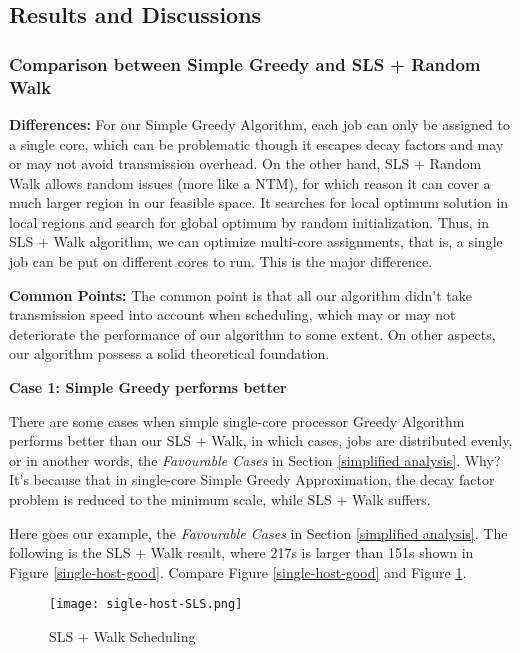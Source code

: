 \documentclass{article}
\begin{document}
\subsection{Results and Discussions}
    \label{comprehensive analysis}
\subsubsection{Comparison between Simple Greedy and SLS + Random Walk}
    \textbf{Differences:} For our Simple Greedy Algorithm, each job can only be assigned to a single core, which can be problematic though it escapes decay factors and may or may not avoid transmission overhead. On the other hand, SLS + Random Walk allows random issues (more like a NTM), for which reason it can cover a much larger region in our feasible space. It searches for local optimum  solution in local regions and search for global optimum by random initialization. Thus, in SLS + Walk algorithm, we can optimize multi-core assignments, that is, a single job can be put on different cores to run. This is  the major difference.
    
    \textbf{Common Points:} 
    The common point is that all our algorithm didn't take transmission speed into account when scheduling, which may or may not deteriorate the performance of our algorithm to some extent. On other aspects, our algorithm possess a solid theoretical foundation.
    
    \textbf{Case 1: Simple Greedy performs better}
    
    There are some cases when simple single-core processor Greedy Algorithm performs better than our SLS + Walk, in which cases, jobs are distributed evenly, or in another words, the \textit{Favourable Cases} in Section \ref{simplified analysis}. Why? It's because that in single-core Simple Greedy Approximation, the decay factor problem is reduced to the minimum scale, while SLS + Walk suffers.
    
    Here goes our example, the  \textit{Favourable Cases} in Section \ref{simplified analysis}. The following is the SLS + Walk result, where 217s is larger than 151s shown in Figure \ref{single-host-good}. Compare Figure \ref{single-host-good} and Figure \ref{sigle-host-SLS}.
    
    \begin{figure}[H]
        \centering
        \texttt{[image: sigle-host-SLS.png]}
        \caption{SLS + Walk Scheduling}
        \label{sigle-host-SLS}
    \end{figure}
    
\end{document}
